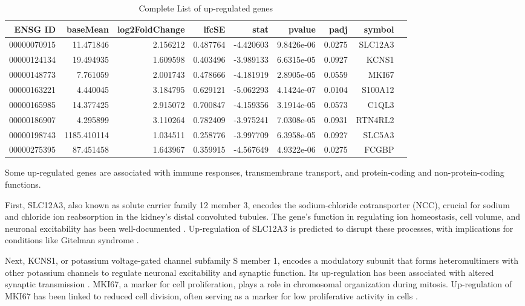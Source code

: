 \begin{table}[H]
    \centering
    \begin{tabular}{rrrrrrrrl}
    \toprule
    ENSG ID & baseMean & log2FoldChange & lfcSE & stat & pvalue & padj & symbol \\
    \midrule
    00000070915 & 11.471846 & 2.156212 & 0.487764 & -4.420603 & 9.8426e-06 & 0.0275 & SLC12A3 \\
    00000124134 & 19.494935 & 1.609598 & 0.403496 & -3.989133 & 6.6315e-05 & 0.0927 & KCNS1 \\
    00000148773 & 7.761059 & 2.001743 & 0.478666 & -4.181919 & 2.8905e-05 & 0.0559 & MKI67 \\
    00000163221 & 4.440045 & 3.184795 & 0.629121 & -5.062293 & 4.1424e-07 & 0.0104 & S100A12 \\
    00000165985 & 14.377425 & 2.915072 & 0.700847 & -4.159356 & 3.1914e-05 & 0.0573 & C1QL3 \\
    00000186907 & 4.295899 & 3.110264 & 0.782409 & -3.975241 & 7.0308e-05 & 0.0931 & RTN4RL2 \\
    00000198743 & 1185.410114 & 1.034511 & 0.258776 & -3.997709 & 6.3958e-05 & 0.0927 & SLC5A3 \\
    00000275395 & 87.451458 & 1.643967 & 0.359915 & -4.567649 & 4.9322e-06 & 0.0275 & FCGBP \\
    \bottomrule
    \end{tabular}
    \caption{Complete List of up-regulated genes}
    \label{table:down_regulated}
\end{table}
Some up-regulated genes are associated with immune responses, transmembrane transport, and protein-coding and non-protein-coding functions.

First, SLC12A3, also known as solute carrier family 12 member 3, encodes the sodium-chloride cotransporter (NCC), crucial for sodium and chloride ion reabsorption in the kidney's distal convoluted tubules. The gene’s function in regulating ion homeostasis, cell volume, and neuronal excitability has been well-documented \cite{Zhang2023Role, Li2022Gitelman, Trejo2023CryoEM}. Up-regulation of SLC12A3 is predicted to disrupt these processes, with implications for conditions like Gitelman syndrome \cite{Li2022Gitelman}.

Next, KCNS1, or potassium voltage-gated channel subfamily S member 1, encodes a modulatory subunit that forms heteromultimers with other potassium channels to regulate neuronal excitability and synaptic function. Its up-regulation has been associated with altered synaptic transmission \cite{Koch2020Potassium}. MKI67, a marker for cell proliferation, plays a role in chromosomal organization during mitosis. Up-regulation of MKI67 has been linked to reduced cell division, often serving as a marker for low proliferative activity in cells \cite{Rahman2015Ki67}.

